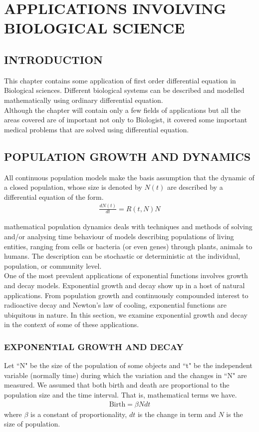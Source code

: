 \documentclass[11pt]{report}
\newcommand{\NI}{\noindent}
\begin{document}
	
	\chapter{APPLICATIONS INVOLVING BIOLOGICAL SCIENCE}
	\section{INTRODUCTION}
	This chapter contains some application of first order differential equation in Biological sciences. Different biological systems can be described and modelled mathematically using ordinary differential equation. \\

	\NI Although the chapter will contain only a few fields of applications but all the areas covered are of important not only to Biologist, it covered some important medical problems that are solved using differential equation.

	\section{POPULATION GROWTH AND DYNAMICS}
	All continuous population models make the basis assumption that the dynamic of a closed population, whose size is denoted by $N(t)$ are described by a differential equation of the form.
	\begin{eqnarray}
		\frac{dN(t)}{dt} = R(t,N)N
	\end{eqnarray} 
	
	mathematical population dynamics deals with techniques and methods of solving and/or analysing time behaviour of models describing populations of living entities, ranging from cells or bacteria (or even genes) through plants, animals to humans. The description can be stochastic or deterministic at the individual, population, or community level.\\
	
	\NI One of the most prevalent applications of exponential functions involves growth and decay models. Exponential growth and decay show up in a host of natural applications. From population growth and continuously compounded interest to radioactive decay and Newton’s law of cooling, exponential functions are ubiquitous in nature. In this section, we examine exponential growth and decay in the context of some of these applications.

	\subsection{EXPONENTIAL GROWTH AND DECAY}
	Let ``N" be the size of the population of some objects and ``t" be the independent variable (normally time) during which the variation and the changes in ``N" are measured. We assumed that both birth and death are proportional to the population size and the time interval. That is, mathematical terms we have. 
	\begin{eqnarray}
		\text{Birth} = \beta N dt
	\end{eqnarray}
	where $\beta$ is a constant of proportionality, $dt$ is the change in term and $N$ is the size of population.\\
	
\end{document}
